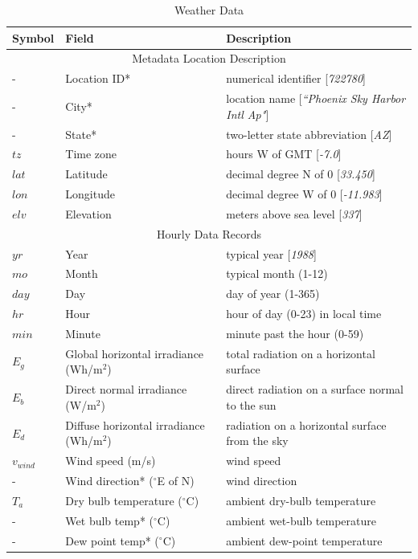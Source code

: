 \documentclass[12pt,letterpaper]{article}
\begin{document}
\begin{table}
\begin{center}
\caption{Weather Data}
\begin{tabular}{lll}
\midrule
Symbol & Field & Description\\
\midrule
\multicolumn{3}{c}{Metadata Location Description}\\
- & Location ID* & numerical identifier [\textit{722780}]\\
 - & City* & location name [\textit{``Phoenix Sky Harbor Intl Ap"}]\\
- & State* & two-letter state abbreviation [\textit{AZ}]\\
$\mathit{tz}$ &Time zone & hours W of GMT [\textit{-7.0}] \\
$\mathit{lat}$ & Latitude & decimal degree N of 0 [\textit{33.450}] \\
$\mathit{lon}$ & Longitude & decimal degree W of 0 [\textit{-11.983}]\\
$\mathit{elv}$ & Elevation & meters above sea level [\textit{337}]\\
\midrule
\multicolumn{3}{c}{Hourly Data Records}\\
$\mathit{yr}$& Year & typical year [\textit{1988}] \\
$\mathit{mo}$ & Month & typical month (1-12) \\
$\mathit{day}$ & Day & day of year (1-365) \\
$\mathit{hr}$ & Hour & hour of day (0-23) in local time \\
$\mathit{min}$ & Minute & minute past the hour (0-59) \\
$E_g$ & Global horizontal irradiance (Wh/m$^2$) & total radiation on a horizontal surface \\
$E_b$ & Direct normal irradiance (W/m$^2$) & direct radiation on a surface normal to the sun \\
$E_d$ & Diffuse horizontal irradiance (Wh/m$^2$) & radiation on a horizontal surface from the sky \\
$v_{wind}$ & Wind speed (m/s) & wind speed \\
-  & Wind direction* ($^{\circ}$E of N) & wind direction \\
$T_a$ & Dry bulb temperature ($^{\circ}$C) & ambient dry-bulb temperature \\
- & Wet bulb temp* ($^{\circ}$C) & ambient wet-bulb temperature \\
- & Dew point temp* ($^{\circ}$C) & ambient dew-point temperature \\

\end{tabular}
\end{center}
\end{table}
\end{document}
